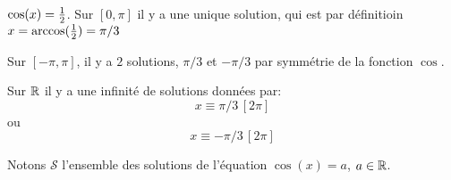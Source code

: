 \documentclass[a4paper, 11pt]{article}
\begin{document}
$\cos(x) = \frac{1}{2}$. 
Sur $[0,\pi]$ il y a une unique solution, qui est par définitioin 
$x = \arccos (\frac{1}{2}) = \pi/3$

Sur $[-\pi, \pi]$, il y a $2$ solutions, $\pi/3$ et $-\pi/3$ par symmétrie de la fonction $\cos$. 

Sur $\mathbb{R}$ il y a une infinité de solutions données par:
$$x  \equiv \pi/3\,  [2\pi]$$
ou 
$$x  \equiv -\pi/3\,  [2\pi]$$


%



 Notons $\mathcal{S}$ l'ensemble des solutions de l'\'equation $\cos{(x)}=a$, $a\in\mathbb{R}$.
 
 \begin{center}
\end{center}
\end{document}

